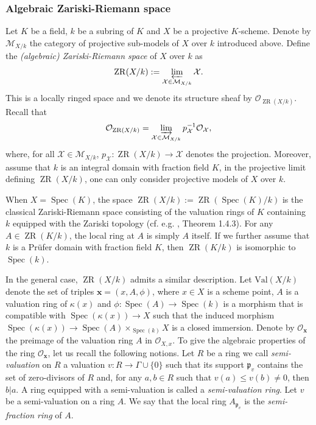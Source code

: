 \documentclass [11pt,reqno]{amsart}
\newcommand{\1}{\mathmybb{1}}
\def\cM{{\mathcal{M}}}
\def\cO{{\mathcal{O}}}
\def\cX{{\mathcal{X}}}
\def\p{\mathfrak p}
\def\Spec{\operatorname{Spec}}
\def\ZR{\operatorname{ZR}}
\begin{document}
\subsubsection{Algebraic Zariski-Riemann space}
\label{subsub:Zariski-Riemann_space_algebraic}

Let $K$ be a field, $k$ be a subring of $K$ and $X$ be a projective $K$-scheme. Denote by $\cM_{X/k}$ the category of projective sub-models of $X$ over $k$ introduced above. Define the \emph{(algebraic) Zariski-Riemann space} of $X$ over $k$ as  
\begin{align*}
\ZR(X/k) := \displaystyle\varprojlim_{\cX \in \cM_{X/k}} \cX.
\end{align*}
This is a locally ringed space and we denote its structure sheaf by $\cO_{\ZR(X/k)}$. Recall that 
\begin{align*}
\cO_{\ZR(X/k)} = \displaystyle\varinjlim_{\cX \in \cM_{X/k}} p_{\cX}^{-1}\cO_{\cX},
\end{align*}
where, for all $\cX\in\cM_{X/k}$, $p_{\cX} : \ZR(X/k)\to \cX$ denotes the projection. Moreover, assume that $k$ is an integral domain with fraction field $K$, in the projective limit defining $\ZR(X/k)$, one can only consider projective models of $X$ over $k$.

\begin{example}
\label{example:ZR_algebraic}
When $X=\Spec(K)$, the space $\ZR(X/k):=\ZR(\Spec(K)/k)$ is the classical Zariski-Riemann space consisting of the valuation rings of $K$ containing $k$ equipped with the Zariski topology (cf. e.g. \cite{Sedillot_pav}, Theorem 1.4.3). For any $A\in \ZR(K/k)$, the local ring at $A$ is simply $A$ itself. If we further assume that $k$ is a Prüfer domain with fraction field $K$, then $\ZR(K/k)$ is isomorphic to $\Spec(k)$.
\end{example}

In the general case, $\ZR(X/k)$ admits a similar description. Let $\mathrm{Val}(X/k)$ denote the set of triples $\mathbf{x}=(x,A,\phi)$, where $x\in X$ is a scheme point, $A$ is a valuation ring of $\kappa(x)$ and $\phi : \Spec(A) \to \Spec(k)$ is a morphism that is compatible with $\Spec(\kappa(x))\to X$ such that the induced morphism $\Spec(\kappa(x)) \to \Spec(A) \times_{\Spec(k)} X$ is a closed immersion. Denote by $\cO_{\mathbf{x}}$ the preimage of the valuation ring $A$ in $\cO_{X,x}$. To give the algebraic properties of the ring $\cO_{\mathbf{x}}$, let us recall the following notions. Let $R$ be a ring we call \emph{semi-valuation} on $R$ a valuation $v : R \to \Gamma\cup\{0\}$ such that its support $\p_{v}$ contains the set of zero-divisors of $R$ and, for any $a,b\in R$ such that $v(a)\leq v(b)\neq 0$, then $b|a$. A ring equipped with a semi-valuation is called a \emph{semi-valuation ring}. Let $v$ be a semi-valuation on a ring $A$. We say that the local ring $A_{\p_{v}}$ is the \emph{semi-fraction ring} of $A$.
\end{document}
